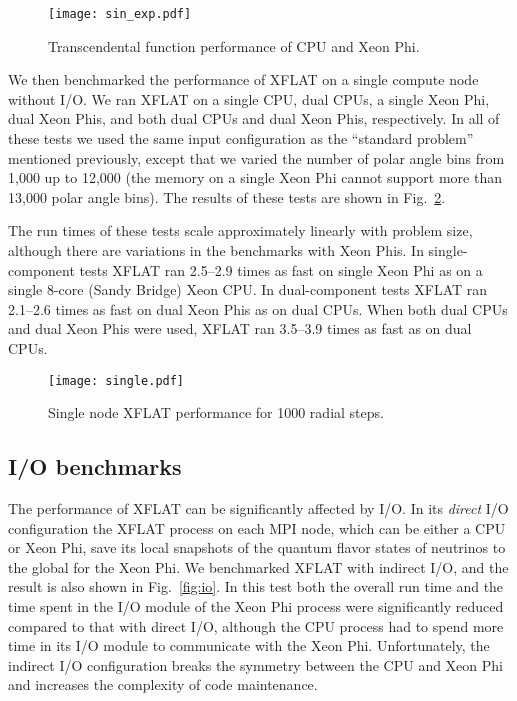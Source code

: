 \documentclass{sig-alternate}
\begin{document}
\begin{figure}
\centering
\texttt{[image: sin\_exp.pdf]}
\caption{Transcendental function performance of CPU and Xeon Phi.}
\label{fig:sin_exp}
\end{figure}



We then benchmarked the performance of XFLAT on a single compute node
without I/O. We ran XFLAT on a single CPU, dual CPUs, a single
Xeon Phi, dual Xeon Phis, and both dual CPUs and dual Xeon Phis, respectively.
In all of these tests we used the same input configuration as the ``standard problem''
mentioned previously, except that we varied the
number of polar angle bins from 1,000 up to 12,000 (the memory on a
single Xeon Phi cannot support more than 13,000 polar
angle bins). The results of these tests are shown in Fig.~\ref{fig:snode}.

The run times of these tests scale approximately linearly with problem size, although there are variations in the benchmarks with
Xeon Phis. In single-component tests XFLAT ran 2.5--2.9 times as 
fast on single Xeon Phi as on a single 8-core (Sandy Bridge) Xeon
CPU. In dual-component tests XFLAT ran 2.1--2.6 times as
fast on dual Xeon Phis as on dual CPUs. When both dual CPUs and dual
Xeon Phis were used, XFLAT ran 3.5--3.9 times as fast as on dual CPUs.

\begin{figure}[t]
\centering
\texttt{[image: single.pdf]}
\caption{Single node XFLAT performance for 1000 radial steps.}
\label{fig:snode}
\end{figure}


\subsection{I/O benchmarks}

The performance of XFLAT can be significantly affected by I/O. 
In its \emph{direct} I/O configuration the XFLAT process on each MPI node,
which can be either a CPU or Xeon Phi,
save its local snapshots of the 
quantum flavor states of neutrinos to the global \texttt{\SCRATCH} for the Xeon Phi. 
We benchmarked XFLAT with indirect I/O, and the result is also shown
in Fig.~\ref{fig:io}. In this test both the overall run time and the
time spent in 
the I/O module of the Xeon Phi process
were significantly reduced compared to that with direct I/O, although
the CPU process had to spend more time in its I/O module to
communicate with the Xeon Phi.
Unfortunately, the indirect I/O configuration breaks the
symmetry between the CPU and Xeon Phi and increases the
complexity of code maintenance.
\end{document}
